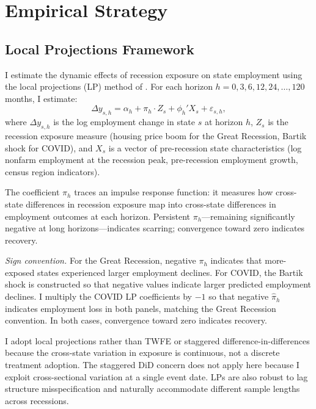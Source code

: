 \documentclass[12pt]{article}
\begin{document}
\section{Empirical Strategy}
\label{sec:strategy}

\subsection{Local Projections Framework}

I estimate the dynamic effects of recession exposure on state employment using the local projections (LP) method of \citet{jorda2005estimation}. For each horizon $h = 0, 3, 6, 12, 24, \ldots, 120$ months, I estimate:
\begin{equation}
\Delta y_{s,h} = \alpha_h + \pi_h \cdot Z_s + \phi_h' X_s + \varepsilon_{s,h},
\label{eq:lp}
\end{equation}
where $\Delta y_{s,h}$ is the log employment change in state $s$ at horizon $h$, $Z_s$ is the recession exposure measure (housing price boom for the Great Recession, Bartik shock for COVID), and $X_s$ is a vector of pre-recession state characteristics (log nonfarm employment at the recession peak, pre-recession employment growth, census region indicators).

The coefficient $\pi_h$ traces an impulse response function: it measures how cross-state differences in recession exposure map into cross-state differences in employment outcomes at each horizon. Persistent $\pi_h$---remaining significantly negative at long horizons---indicates scarring; convergence toward zero indicates recovery.

\textit{Sign convention.} For the Great Recession, negative $\pi_h$ indicates that more-exposed states experienced larger employment declines. For COVID, the Bartik shock is constructed so that negative values indicate larger predicted employment declines. I multiply the COVID LP coefficients by $-1$ so that negative $\hat{\pi}_h$ indicates employment loss in both panels, matching the Great Recession convention. In both cases, convergence toward zero indicates recovery.

I adopt local projections rather than TWFE or staggered difference-in-differences because the cross-state variation in exposure is continuous, not a discrete treatment adoption. The staggered DiD concern \citep{goodmanbacon2021difference, callaway2021difference} does not apply here because I exploit cross-sectional variation at a single event date. LPs are also robust to lag structure misspecification \citep{ramey2016macroeconomic, plagborg2021local} and naturally accommodate different sample lengths across recessions.
\end{document}
